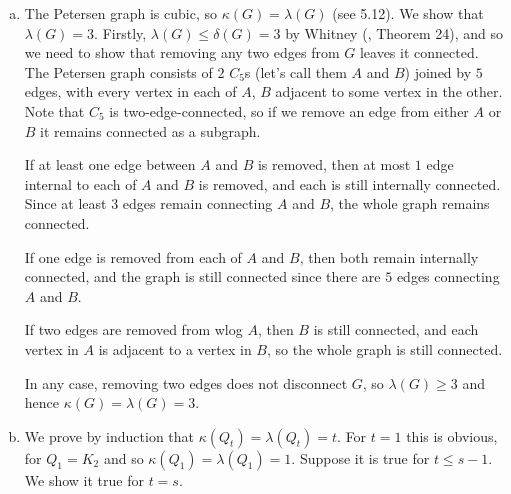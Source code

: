 \begin{enumerate}[(a)]
	\item The Petersen graph is cubic, so $\kappa(G)=\lambda(G)$
		(see 5.12). We show that $\lambda(G)=3$. Firstly, 
		$\lambda(G) \le \delta(G)=3$ by Whitney (\cite{notes}, Theorem 24),
		and so we need to show that removing any two edges from $G$ leaves it
		connected. The Petersen graph consists of $2$ $C_5$s (let's call them $A$ and $B$)
		joined
		by $5$ edges, with every vertex in each of $A$, $B$ adjacent to some
		vertex in the other. Note that $C_5$ is two-edge-connected, so if we
		remove an edge from either $A$ or $B$ it remains connected as a subgraph.
		
		If at least one edge between $A$ and $B$ is removed, then at most $1$
		edge internal to each of $A$ and $B$ is removed, and each is still
		internally connected. Since at least $3$ edges remain connecting $A$ and
		$B$, the whole graph remains connected.

		If one edge is removed from each of $A$ and $B$, then both remain
		internally connected, and the graph is still connected since there
		are $5$ edges connecting $A$ and $B$.

		If two edges are removed from wlog $A$, then $B$ is still
		connected, and each vertex in $A$ is adjacent to a vertex in $B$,
		so the whole graph is still connected.

		In any case, removing two edges does not disconnect $G$, so
		$\lambda(G) \ge 3$ and hence $\kappa(G)=\lambda(G)=3$.

\item We prove by induction that $\kappa(Q_t)=\lambda(Q_t)=t$. For
	$t=1$ this is obvious, for $Q_1=K_2$ and so $\kappa(Q_1)=\lambda(Q_1)=1$.
	Suppose it is true for $t\le s-1$. We show it true for $t=s$.


\end{enumerate}
